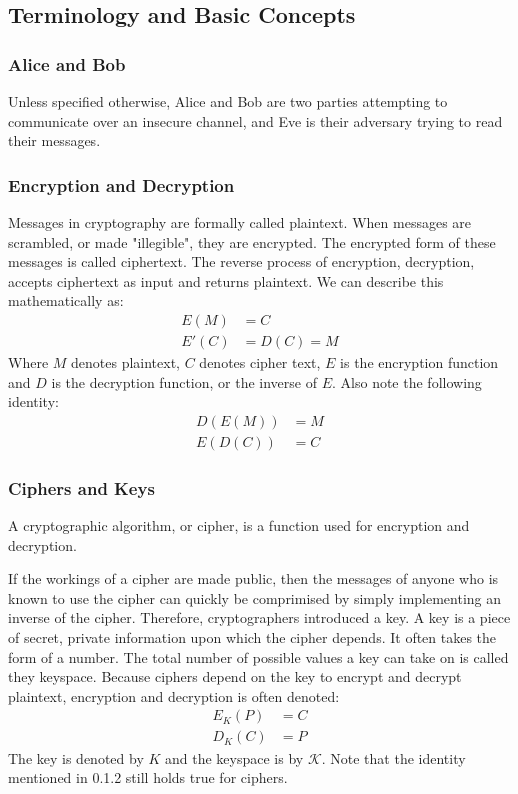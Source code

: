 \documentclass[12pt, a4paper, draft]{report}
\begin{document}
\subsection{Terminology and Basic Concepts}

\subsubsection{Alice and Bob}

Unless specified otherwise, Alice and Bob are two parties attempting to
communicate over an insecure channel, and Eve is their adversary trying to
read their messages.

\subsubsection{Encryption and Decryption}

Messages in cryptography are formally called plaintext. When messages are
scrambled, or made "illegible", they are encrypted. The encrypted form
of these messages is called ciphertext. The reverse process of encryption,
decryption, accepts ciphertext as input and returns plaintext. We can
describe this mathematically as:
\begin{align*}
    E(M) & = C\\
    E'(C) & = D(C) = M
\end{align*}
Where $M$ denotes plaintext, $C$ denotes cipher text, $E$ is the encryption
function and $D$ is the decryption function, or the inverse of $E$. Also
note the following identity:
\begin{align*}
    D(E(M)) & = M\\
    E(D(C)) & = C
\end{align*}

\subsubsection{Ciphers and Keys}

A cryptographic algorithm, or cipher, is a function used for encryption
and decryption.

If the workings of a cipher are made public, then the messages
of anyone who is known to use the cipher can quickly be comprimised
by simply implementing an inverse of the cipher. Therefore, cryptographers
introduced a key. A key is a piece of secret, private information
upon which the cipher depends. It often takes the form of a number.
The total number of possible values a key can take on is called they
keyspace. Because ciphers depend on the key to encrypt and decrypt
plaintext, encryption and decryption is often denoted:
\begin{align*}
    E_K(P) & = C\\
    D_K(C) & = P
\end{align*}
The key is denoted by $K$ and the keyspace is by $\mathcal{K}$. Note that
the identity mentioned in 0.1.2 still holds true for ciphers.
\end{document}
